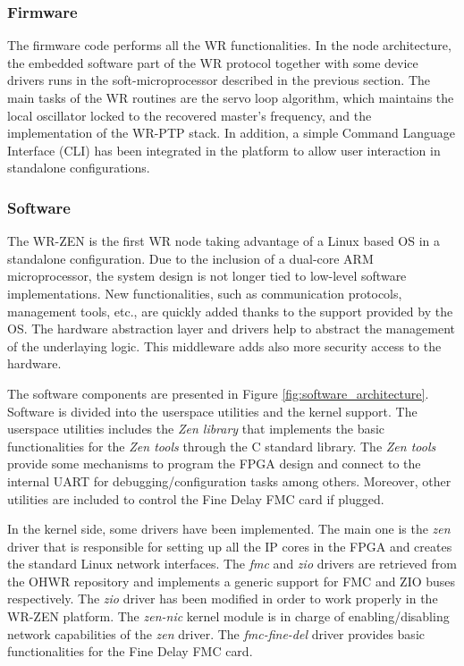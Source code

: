 \subsubsection{Firmware} \label{subsec:firmware}

The firmware code performs all the WR functionalities. 
In the node architecture, the embedded software part of the WR protocol together with some device drivers runs in the soft-microprocessor described in the previous section. The main tasks of the WR routines are the servo loop algorithm, which maintains the local oscillator locked to the recovered master's frequency, and the implementation of the WR-PTP stack. In addition, a simple Command Language Interface (CLI) has been integrated in the platform to allow user interaction in standalone configurations.

\subsubsection{Software} \label{subsec:software}

The WR-ZEN is the first WR node taking advantage of a Linux based OS in a standalone configuration.  
Due to the inclusion of a dual-core ARM microprocessor, the system design is not longer tied to low-level software implementations. New functionalities, such as communication protocols, management tools, etc., are quickly added thanks to the support provided by the OS. The hardware abstraction layer and drivers help to abstract the management of the underlaying logic. This middleware adds also more security access to the hardware.

The software components are presented in Figure
\ref{fig:software_architecture}. Software is divided into the userspace utilities and the kernel support. The userspace utilities includes the \textit{Zen library} that implements the basic functionalities for the \textit{Zen tools} through the C standard library. The \textit{Zen tools} provide some mechanisms to program the FPGA design and connect to the internal UART for debugging/configuration tasks among others.  Moreover, other utilities are included to control the Fine Delay FMC card if plugged.

In the kernel side, some drivers have been implemented. The main one is the
\textit{zen} driver that is responsible for setting up all the IP cores in the
FPGA and creates the standard Linux network interfaces. The \textit{fmc} and
\textit{zio} drivers are retrieved from the OHWR repository and implements a
generic support for FMC and ZIO buses respectively.  The \textit{zio} driver
has been modified in order to work properly in the WR-ZEN platform.  The
\textit{zen-nic} kernel module is in charge of enabling/disabling network
capabilities of the \textit{zen} driver. The \textit{fmc-fine-del} driver
provides basic functionalities for the Fine Delay FMC card.

